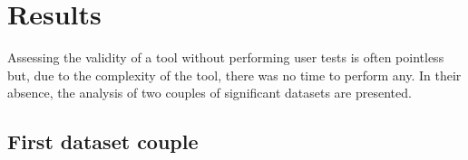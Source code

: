 \chapter{Results}
\label{results}

Assessing the validity of a tool without performing user tests is often pointless but, due to the complexity of the tool, there was no time to perform any. In their absence, the analysis of two couples of significant datasets are presented.

\section{First dataset couple}

